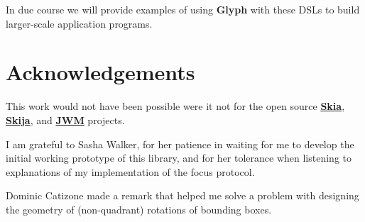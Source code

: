 \documentclass[12pt,a4paper]{article}
\def\Glyph{\textbf{Glyph}\xspace}
\def\S#1{\section{#1}}
\begin{document}
In due course we will provide examples of using \Glyph with these DSLs
to build larger-scale application programs.



\S{Acknowledgements}
This work would not have been possible were it not for the
open source \href{https://skia.org/}{\textbf{Skia}},
\href{https://github.com/HumbleUI/HumbleUI}{\textbf{Skija}},
and \href{https://github.com/HumbleUI/JWM}{\textbf{JWM}} projects.

I am grateful to Sasha Walker,
for her patience in waiting for me to develop the initial working prototype of this
library, and for her tolerance when listening to explanations of my implementation
of the focus protocol. 

Dominic Catizone\Footnotemark{$*$} made a remark that helped me solve a
problem with designing the geometry of (non-quadrant) rotations of bounding boxes.
\end{document}
